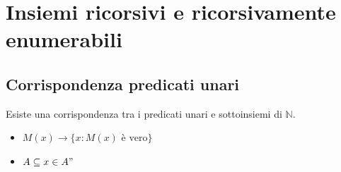 \chapter{Insiemi ricorsivi e ricorsivamente enumerabili}

\section{Corrispondenza predicati unari}
Esiste una corrispondenza tra i predicati unari e sottoinsiemi di $\mathbb{N}$.

\begin{itemize}
	\item $M(x) \to \{x: M(x) \text{ è vero}\}$
	\item $A \subseteq x \in A"$
\end{itemize}